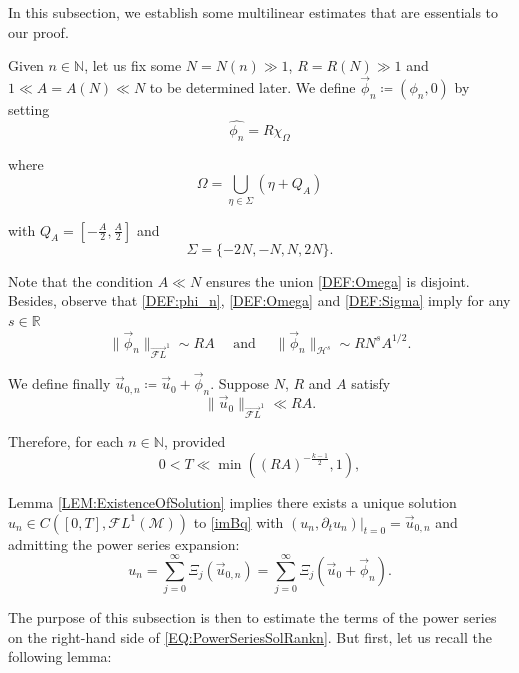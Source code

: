 \documentclass[letterpaper, 11pt,  reqno]{amsart}
\newcommand{\1}{\hspace{0.5mm}\text{I}\hspace{0.5mm}}
\newcommand{\noi}{\noindent}
\newcommand{\R}{\mathbb{R}}
\newcommand{\M}{\mathcal{M}}
\newcommand{\NB}{\mathbb{N}}
\newcommand{\FL}{\mathcal{F}L} %
\newcommand{\FLv}{\overrightarrow{\mathcal{F}L}}
\renewcommand{\H}{\mathcal{H}}
\newcommand{\Si}{\Sigma}
\newcommand{\dt}{\partial_t}
\renewcommand{\O}{\Omega}
\numberwithin{equation}{section}
\numberwithin{theorem}{section}
\begin{document}
In this subsection, we establish some multilinear estimates that are essentials to our proof.

Given $n \in \NB$, let us fix some $N = N(n) \gg 1$, $R = R(N) \gg 1$ and $ 1 \ll A = A(N) \ll N$ to be determined later. We define $\vec{\phi}_n \coloneqq (\phi_{n} , 0)$ by setting
\begin{equation}
\label{DEF:phi_n}
\widehat{\phi_n} = R \chi_\O
\end{equation}

\noi where 
\begin{equation}
\label{DEF:Omega}
\O = \bigcup_{\eta \in \Si} (\eta + Q_A)
\end{equation}

\noi with $Q_A = [-\frac A2 , \frac A2]$ and
\begin{equation}
\label{DEF:Sigma}
\Si = \{ -2N, -N, N, 2N\}.
\end{equation}

\noi Note that the condition $A \ll N$ ensures the union \eqref{DEF:Omega} is disjoint. Besides, observe that \eqref{DEF:phi_n}, \eqref{DEF:Omega} and \eqref{DEF:Sigma} imply for any $s \in \R$
\begin{equation}
\label{EQ:EstPhi_n}
\| \vec{\phi}_n \|_{\FLv^1} \sim RA \quad \text{ and } \quad \| \vec{\phi}_n \|_{\H^s} \sim RN^s A^{1/2}.
\end{equation}

\noi We define finally $\vec{u}_{0,n} \coloneqq \vec{u}_0 + \vec{\phi}_n$. Suppose $N$, $R$ and $A$ satisfy 
\begin{equation}
\label{EQ:CondFL1u}
\| \vec{u}_0 \|_{\FLv^1} \ll RA.
\end{equation}

\noi Therefore, for each $n \in \NB$, provided 
\begin{equation}
\label{EQ:CondOnT}
0 < T \ll \min( (RA)^{-\frac{k-1}{2}} , 1),
\end{equation}

\noi Lemma \ref{LEM:ExistenceOfSolution} implies there exists a unique solution $u_n \in C([0,T], \FL^1(\M))$ to \eqref{imBq} with $(u_n , \dt u_n) |_{t=0} = \vec{u}_{0,n}$ and admitting the power series expansion:
\begin{equation}
\label{EQ:PowerSeriesSolRankn}
u_n = \sum_{j = 0}^\infty \Xi_j (\vec{u}_{0,n}) = \sum_{j = 0}^\infty \Xi_j (\vec{u}_{0} + \vec{\phi}_n) .
\end{equation}

\noi The purpose of this subsection is then to estimate the terms of the power series on the right-hand side of \eqref{EQ:PowerSeriesSolRankn}. But first, let us recall the following lemma:
\end{document}
